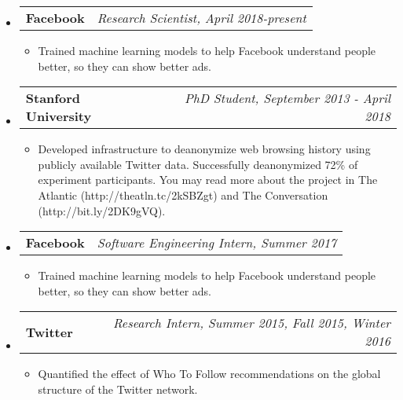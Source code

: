 \documentclass[letterpaper,10pt]{article}
\makeatletter
\newcommand{\ressubheading}[4]{
\begin{tabular*}{7.0in}{l@{\extracolsep{\fill}}r}
		\textbf{#1} & \textit{#4} \\
\end{tabular*}\vspace{-6pt}}
\makeatother
\begin{document}
\begin{itemize}
\item
	\ressubheading{Facebook}{Menlo Park, CA}{Research Scientist}{Research Scientist, April 2018-present}
	\begin{itemize}
	\item Trained machine learning models to help Facebook understand people better, so they can show better ads.
	\end{itemize}
\item
	\ressubheading{Stanford University}{Stanford, CA}{PhD Student}{PhD Student, September 2013 - April 2018}
	\begin{itemize}
	\item Developed infrastructure to deanonymize web browsing history using publicly available Twitter data.  Successfully deanonymized 72\% of experiment participants.  You may read more about the project in The Atlantic (http://theatln.tc/2kSBZgt) and The Conversation (http://bit.ly/2DK9gVQ).
	\end{itemize}
\item
	\ressubheading{Facebook}{Seattle, WA}{Software Engineering Intern}{Software Engineering Intern, Summer 2017}
	\begin{itemize}
	\item Trained machine learning models to help Facebook understand people better, so they can show better ads.
	\end{itemize}
\item
	\ressubheading{Twitter}{San Francisco, CA}{Research Intern}{Research Intern, Summer 2015, Fall 2015, Winter 2016}
	\begin{itemize}
\item Quantified the effect of Who To Follow recommendations on the global structure of the Twitter network.


\end{itemize}
\end{itemize}
\end{document}
